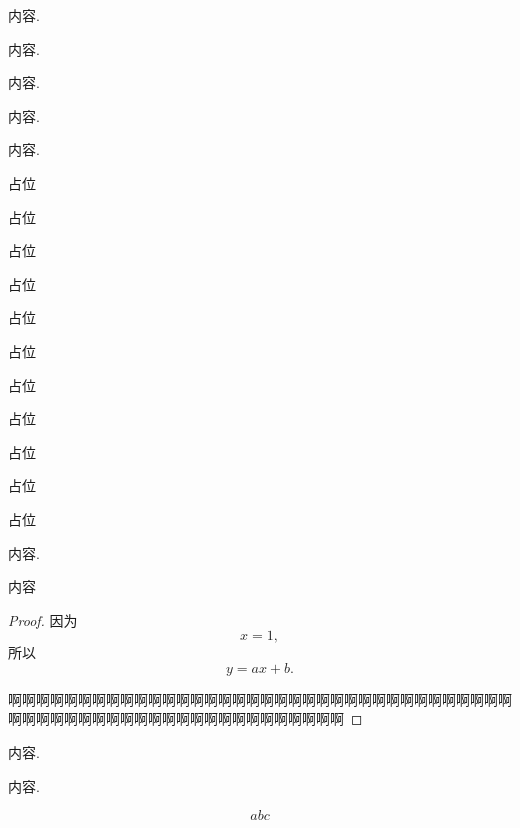 \documentclass[zihao=-4,fontset=windows]{MyBeautybook-CN}
\begin{document}
    \begin{solution}
        内容.
    \end{solution}

    \begin{proposition}
        内容.
    \end{proposition}

    \begin{theorem}[][名称]
        内容.
    \end{theorem}

    \begin{example}
        内容.
    \end{example}

    \begin{corollary}
        内容.

        占位

        占位

        占位

        占位

        占位

        占位

        占位

        占位

        占位

        占位

        占位
    \end{corollary}

    \begin{example}
        内容.

        内容
    \end{example}

    \begin{proof}
        因为
        $$
        x=1,
        $$
        所以
        $$
        y=ax+b.
        $$

        啊啊啊啊啊啊啊啊啊啊啊啊啊啊啊啊啊啊啊啊啊啊啊啊啊啊啊啊啊啊啊啊啊啊啊啊啊啊啊啊啊啊啊啊啊啊啊啊啊啊啊啊啊啊啊啊啊啊啊啊
    \end{proof}

    \begin{conclusion}
        内容.
    \end{conclusion}

    \begin{conclusion}
        内容.
    \end{conclusion}

    \begin{property}
        \begin{equation}
            abc
        \end{equation}
    \end{property}
\end{document}
